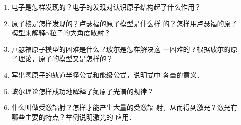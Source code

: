\begin{enumerate}
    \item 电子是怎样发现的？电子的发现对认识原子结构起了什么作用？
    \item 原子核是怎样发现的？卢瑟福的原子模型是什么样
的？怎样用卢瑟福的原子模型来解释$\alpha$粒子的大角度散射？
\item 卢瑟福原子模型的困难是什么？玻尔是怎样解决这
一困难的？根据玻尔的原子理论，原子的模型又是怎样的？
\item 写出氢原子的轨道半径公式和能级公式，说明式中
各量的意义．
\item 玻尔理论怎样成功地解释了氮原子光谱的规律？
\item 什么叫做受激辐射？怎样才能产生大量的受激辐
射，从而得到激光？激光有哪些主要的特点？举例说明激光的
应用．
\end{enumerate}


































